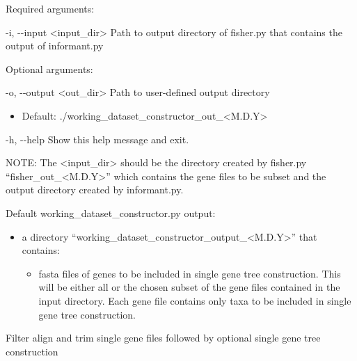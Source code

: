\documentclass{article}
\begin{document}
\begin{enumerate}[itemsep=12pt]
        \begin{description}
            \item Required arguments:
            \begin{description}
                \item -i, -\/-input \hspace{0.2cm} <input\_dir> \hspace{0.2cm} Path to output directory of fisher.py that contains the output of informant.py
            \end{description}
            \vspace{0.2cm}
            \item Optional arguments:
            \begin{description}
                \item -o, -\/-output \hspace{0.2cm} <out\_dir> \hspace{0.2cm} Path to user-defined output directory
                \begin{itemize}
                    \item Default: ./working\_dataset\_constructor\_out\_<M.D.Y>
                \end{itemize}
                \item -h, -\/-help \hspace{0.2cm} Show this help message and exit.
            \end{description}
        \end{description}
        NOTE: The <input\_dir> should be the directory created by fisher.py “fisher\_out\_<M.D.Y>” which contains the gene files to be subset and the output directory created by informant.py.
        \vspace{0.2cm}
        \begin{description}
        \item Default working\_dataset\_constructor.py output:
        \begin{itemize}
            \item a directory “working\_dataset\_constructor\_output\_<M.D.Y>” that contains:
            \begin{itemize}
                \item fasta files of genes to be included in single gene tree construction. This will be either all or the chosen subset of the gene files contained in the input directory. Each gene file contains only taxa to be included in single gene tree construction.
            \end{itemize}
        \end{itemize}
        \end{description}
    \item Filter align and trim single gene files followed by optional single gene tree construction
    

\end{enumerate}
\end{document}

